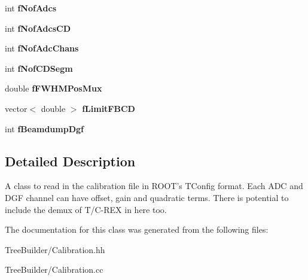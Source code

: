 \begin{DoxyCompactItemize}
\item 
\hypertarget{class_calibration_a492ca80c45be9ce1d85dfbf9f5852030}{int {\bfseries f\-Nof\-Adcs}}\label{class_calibration_a492ca80c45be9ce1d85dfbf9f5852030}

\item 
\hypertarget{class_calibration_af87f261e5f5b78583250d67e8e08419a}{int {\bfseries f\-Nof\-Adcs\-C\-D}}\label{class_calibration_af87f261e5f5b78583250d67e8e08419a}

\item 
\hypertarget{class_calibration_abfda2f79950ce5ca7bf1aca363519fc5}{int {\bfseries f\-Nof\-Adc\-Chans}}\label{class_calibration_abfda2f79950ce5ca7bf1aca363519fc5}

\item 
\hypertarget{class_calibration_ab03c449889b48d77b59ddf242a68ef59}{int {\bfseries f\-Nof\-C\-D\-Segm}}\label{class_calibration_ab03c449889b48d77b59ddf242a68ef59}

\item 
\hypertarget{class_calibration_a1e62c67cc989b99f6fc991deabf1641b}{double {\bfseries f\-F\-W\-H\-M\-Pos\-Mux}}\label{class_calibration_a1e62c67cc989b99f6fc991deabf1641b}

\item 
\hypertarget{class_calibration_a659edb01b7d8ae2a574d8513aa6c8ca4}{vector$<$ double $>$ {\bfseries f\-Limit\-F\-B\-C\-D}}\label{class_calibration_a659edb01b7d8ae2a574d8513aa6c8ca4}

\item 
\hypertarget{class_calibration_a1fc1809a608c626d462fe7d0859d52da}{int {\bfseries f\-Beamdump\-Dgf}}\label{class_calibration_a1fc1809a608c626d462fe7d0859d52da}

\end{DoxyCompactItemize}


\subsection{Detailed Description}
A class to read in the calibration file in R\-O\-O\-T's T\-Config format. Each A\-D\-C and D\-G\-F channel can have offset, gain and quadratic terms. There is potential to include the demux of T/\-C-\/\-R\-E\-X in here too. 

The documentation for this class was generated from the following files\-:\begin{DoxyCompactItemize}
\item 
Tree\-Builder/Calibration.\-hh\item 
Tree\-Builder/Calibration.\-cc\end{DoxyCompactItemize}
